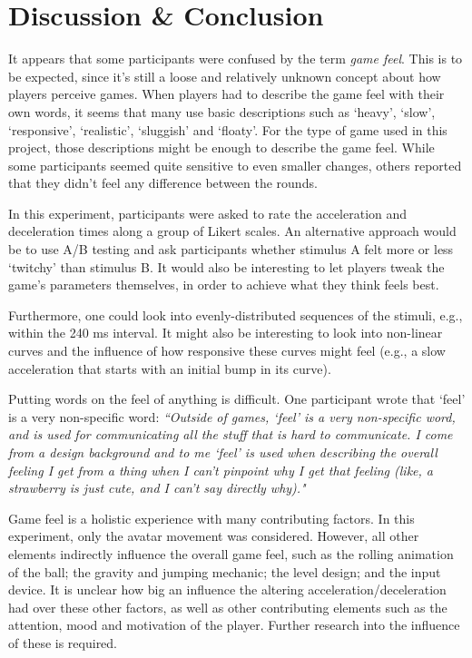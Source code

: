 \section{Discussion \& Conclusion} \label{discussion}
It appears that some participants were confused by the term \textit{game feel}. This is to be expected, since it's still a loose and relatively unknown concept about how players perceive games. When players had to describe the game feel with their own words, it seems that many use basic descriptions such as `heavy', `slow', `responsive', `realistic', `sluggish' and `floaty'. For the type of game used in this project, those descriptions might be enough to describe the game feel. While some participants seemed quite sensitive to even smaller changes, others reported that they didn't feel any difference between the rounds.

In this experiment, participants were asked to rate the acceleration and deceleration times along a group of Likert scales. An alternative approach would be to use A/B testing and ask participants whether stimulus A felt more or less `twitchy' than stimulus B. It would also be interesting to let players tweak the game's parameters themselves, in order to achieve what they think feels best.

Furthermore, one could look into evenly-distributed sequences of the stimuli, e.g., within the 240 ms interval. It might also be interesting to look into non-linear curves and the influence of how responsive these curves might feel (e.g., a slow acceleration that starts with an initial bump in its curve).

Putting words on the feel of anything is difficult. One participant wrote that `feel' is a very non-specific word: \textit{``Outside of games, `feel' is a very non-specific word, and is used for communicating all the stuff that is hard to communicate. I come from a design background and to me `feel' is used when describing the overall feeling I get from a thing when I can't pinpoint why I get that feeling (like, a strawberry is just cute, and I can't say directly why)."}

Game feel is a holistic experience with many contributing factors. In this experiment, only the avatar movement was considered. However, all other elements indirectly influence the overall game feel, such as the rolling animation of the ball; the gravity and jumping mechanic; the level design; and the input device. It is unclear how big an influence the altering acceleration/deceleration had over these other factors, as well as other contributing elements such as the attention, mood and motivation of the player. Further research into the influence of these is required.
